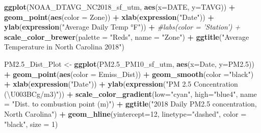 \documentclass[12pt,]{article}
\newenvironment{Shaded}{\begin{snugshade}}{\end{snugshade}}
\newcommand{\KeywordTok}[1]{\textcolor[rgb]{0.13,0.29,0.53}{\textbf{#1}}}
\newcommand{\DataTypeTok}[1]{\textcolor[rgb]{0.13,0.29,0.53}{#1}}
\newcommand{\DecValTok}[1]{\textcolor[rgb]{0.00,0.00,0.81}{#1}}
\newcommand{\StringTok}[1]{\textcolor[rgb]{0.31,0.60,0.02}{#1}}
\newcommand{\CommentTok}[1]{\textcolor[rgb]{0.56,0.35,0.01}{\textit{#1}}}
\newcommand{\OperatorTok}[1]{\textcolor[rgb]{0.81,0.36,0.00}{\textbf{#1}}}
\newcommand{\NormalTok}[1]{#1}
\begin{document}
\begin{Shaded}
\begin{Highlighting}[]
\KeywordTok{ggplot}\NormalTok{(NOAA_DTAVG_NC2018_sf_utm, }\KeywordTok{aes}\NormalTok{(}\DataTypeTok{x=}\NormalTok{DATE, }\DataTypeTok{y=}\NormalTok{TAVG)) }\OperatorTok{+}
\StringTok{  }\KeywordTok{geom_point}\NormalTok{(}\KeywordTok{aes}\NormalTok{(}\DataTypeTok{color =}\NormalTok{ Zone)) }\OperatorTok{+}
\StringTok{  }\KeywordTok{xlab}\NormalTok{(}\KeywordTok{expression}\NormalTok{(}\StringTok{"Date"}\NormalTok{)) }\OperatorTok{+}
\StringTok{  }\KeywordTok{ylab}\NormalTok{(}\KeywordTok{expression}\NormalTok{(}\StringTok{"Average Daily Temp °F"}\NormalTok{)) }\OperatorTok{+}
\StringTok{  }\CommentTok{#labs(color = 'Station') +}
\StringTok{  }\KeywordTok{scale_color_brewer}\NormalTok{(}\DataTypeTok{palette =} \StringTok{"Reds"}\NormalTok{, }\DataTypeTok{name =} \StringTok{"Zone"}\NormalTok{)  }\OperatorTok{+}
\StringTok{  }\KeywordTok{ggtitle}\NormalTok{(}\StringTok{"Average Temperature in North Carolina 2018"}\NormalTok{)}

\NormalTok{PM2.5_Dist_Plot <-}\StringTok{ }\KeywordTok{ggplot}\NormalTok{(PM2.5_PM10_sf_utm, }\KeywordTok{aes}\NormalTok{(}\DataTypeTok{x=}\NormalTok{Date, }\DataTypeTok{y=}\NormalTok{PM2.}\DecValTok{5}\NormalTok{)) }\OperatorTok{+}
\StringTok{  }\KeywordTok{geom_point}\NormalTok{(}\KeywordTok{aes}\NormalTok{(}\DataTypeTok{color =}\NormalTok{ Emiss_Dist)) }\OperatorTok{+}
\StringTok{  }\KeywordTok{geom_smooth}\NormalTok{(}\DataTypeTok{color =}\StringTok{"black"}\NormalTok{) }\OperatorTok{+}
\StringTok{  }\KeywordTok{xlab}\NormalTok{(}\KeywordTok{expression}\NormalTok{(}\StringTok{"Date"}\NormalTok{)) }\OperatorTok{+}
\StringTok{  }\KeywordTok{ylab}\NormalTok{(}\KeywordTok{expression}\NormalTok{(}\StringTok{"PM 2.5 Concentration (\textbackslash{}U003BCg/m3)"}\NormalTok{)) }\OperatorTok{+}
\StringTok{  }\KeywordTok{scale_color_gradient}\NormalTok{(}\DataTypeTok{low=}\StringTok{"cyan"}\NormalTok{, }\DataTypeTok{high=}\StringTok{"blue4"}\NormalTok{, }\DataTypeTok{name =} \StringTok{"Dist. to combustion point (m)"}\NormalTok{)  }\OperatorTok{+}
\StringTok{  }\KeywordTok{ggtitle}\NormalTok{(}\StringTok{"2018 Daily PM2.5 concentration, North Carolina"}\NormalTok{) }\OperatorTok{+}
\StringTok{  }\KeywordTok{geom_hline}\NormalTok{(}\DataTypeTok{yintercept=}\DecValTok{12}\NormalTok{, }\DataTypeTok{linetype=}\StringTok{"dashed"}\NormalTok{, }\DataTypeTok{color =} \StringTok{"black"}\NormalTok{, }\DataTypeTok{size =} \DecValTok{1}\NormalTok{)}


\end{Highlighting}
\end{Shaded}
\end{document}
